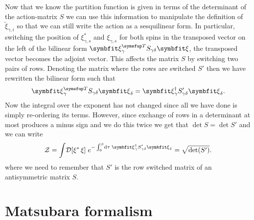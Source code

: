 Now that we know the partition function is given in terms of the determinant of the action-matrix $S$ we can use this information to manipulate the definition
of $\tilde{\xi}_{\gamma,i}$ so that we can still write the action as a sesquilinear form. In particular, switching the position of $\xi_{\gamma,s}^\ast$ and
$\xi_{\gamma,s}$ for both spins in the transposed vector on the left of the bilinear form $\v{\xi}_\gamma^\trans S_{\gamma\delta} \v{\xi}$, the transposed
vector becomes the adjoint vector. This affects the matrix $S$ by switching two pairs of rows. Denoting the matrix where the rows are switched $S'$ then
we have rewritten the bilinear form such that
\begin{equation}
    \label{eq:Field:Ferm:ExNambu:bilinearToSesqui}
    \v{\xi}_\gamma^\trans S_{\gamma\delta}\v{\xi}_\delta = \v{\xi}_\gamma^\dagger S'_{\gamma\delta}\v{\xi}_\delta.
\end{equation}
Now the integral over the exponent has not changed since all we have done is simply re-ordering its terms. However, since exchange of rows in a determinant
at most produces a minus sign and we do this twice we get that $\det S = \det S'$ and we can write
\begin{equation}
    \label{eq:Field:Ferm:ExNambu:partitionFunction:sesquilinear}
    \mathcal{Z} = \int\!\mathcal{D}[\xi^\ast\,\xi]\;e^{-\int_0^\beta\!\mathrm{d}\tau\;\v{\xi}_{\gamma}^\dagger S'_{\gamma\delta}\v{\xi}_{\delta}} = \sqrt{\det(S')}.
\end{equation}
where we need to remember that $S'$ is the row switched matrix of an antisymmetric matrix $S$.


\section{Matsubara formalism}

